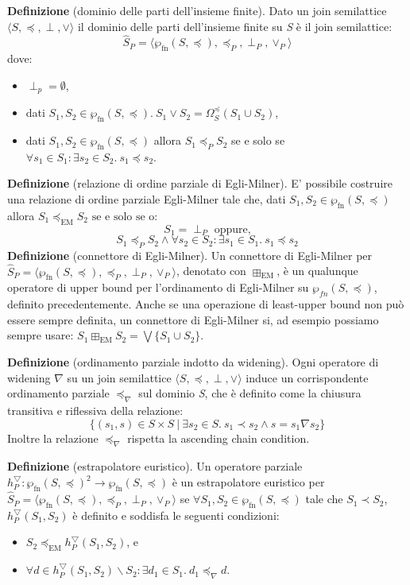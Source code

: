\noindent\textbf{Definizione} (dominio delle parti dell'insieme finite). Dato un join semilattice \(\langle S,\preceq, \perp ,\vee\rangle\) il dominio delle parti dell'insieme finite su \emph{S} è il join semilattice:
\[\hat{S}_P = \langle \wp_{\textrm{fn}}(S, \preceq),\preceq_P, \perp_P ,\vee_P\rangle\]
dove:
\begin{itemize}
	\item \(\perp_p=\emptyset\),
	\item dati \(S_1, S_2\in\wp_{\textrm{fn}}(S, \preceq).\ S_1\vee S_2 = \Omega_{S}^{\preceq}(S_1 \cup S_2)\),
	\item dati \(S_1, S_2\in\wp_{\textrm{fn}}(S, \preceq)\) allora \(S_1 \preceq_P S_2\) se e solo se \(\forall s_1 \in S_1 : \exists s_2 \in S_2.\ s_1\preceq s_2\).
\end{itemize}
\noindent\textbf{Definizione} (relazione di ordine parziale di Egli-Milner). E' possibile costruire una relazione di ordine parziale Egli-Milner tale che, dati \(S_1, S_2\in\wp_{\textrm{fn}}(S, \preceq)\) allora \(S_1 \preceq_{\textrm{EM}} S_2 \textrm{ se e solo se o:} \)
\[S_1=\perp_P\textrm{ oppure,}\]
\[S_1\preceq_P S_2 \wedge \forall s_2\in S_2 : \exists s_1\in S_1.\ s_1\preceq s_2\]
\noindent\textbf{Definizione} (connettore di Egli-Milner). Un connettore di Egli-Milner per \(\hat{S}_P = \langle \wp_{\textrm{fn}}(S, \preceq),\preceq_P, \perp_P ,\vee_P\rangle\), denotato con \(\boxplus_{\textrm{EM}}\), è un qualunque operatore di upper bound per l'ordinamento di Egli-Milner su \(\wp_{fn}(S, \preceq)\), definito precedentemente. Anche se una operazione di least-upper bound non può essere sempre definita, un connettore di Egli-Milner si, ad esempio possiamo sempre usare: \(S_1\boxplus_{\textrm{EM}} S_2 = \bigvee\lbrace S_1 \cup S_2\rbrace\).

\noindent\textbf{Definizione} (ordinamento parziale indotto da widening). Ogni operatore di widening \(\nabla\) su un join semilattice \(\langle S,\preceq, \perp ,\vee\rangle\) induce un corrispondente ordinamento parziale \(\preceq_{\nabla}\) sul dominio \emph{S}, che è definito come la chiusura transitiva e riflessiva della relazione:
\[\lbrace(s_1, s)\in S\times S\ \vert\ \exists s_2\in S.\ s_1\prec s_2 \wedge s = s_1\nabla s_2\rbrace\]
Inoltre la relazione \(\preceq_{\nabla}\) rispetta la ascending chain condition.

\noindent\textbf{Definizione} (estrapolatore euristico). Un operatore parziale \(h_{P}^{\bigtriangledown} : \wp_{\textrm{fn}}(S, \preceq)^2\rightarrow\wp_{\textrm{fn}}(S, \preceq)\) è un estrapolatore euristico per \(\hat{S}_P = \langle \wp_{\textrm{fn}}(S, \preceq),\preceq_P, \perp_P ,\vee_P\rangle\) se \(\forall S_1, S_2\in\wp_{\textrm{fn}}(S, \preceq)\) tale che \(S_1 \prec S_2\), \(h_{P}^{\bigtriangledown}(S_1, S_2)\) è definito e soddisfa le seguenti condizioni:
\begin{itemize}
	\item \(S_2 \preceq_{\textrm{EM}}h_{P}^{\bigtriangledown}(S_1, S_2)\), e
	\item \(\forall d \in h_{P}^{\bigtriangledown}(S_1, S_2)\backslash S_2 : \exists d_1\in S_1.\ d_1\preceq_{\nabla} d\).
\end{itemize}

